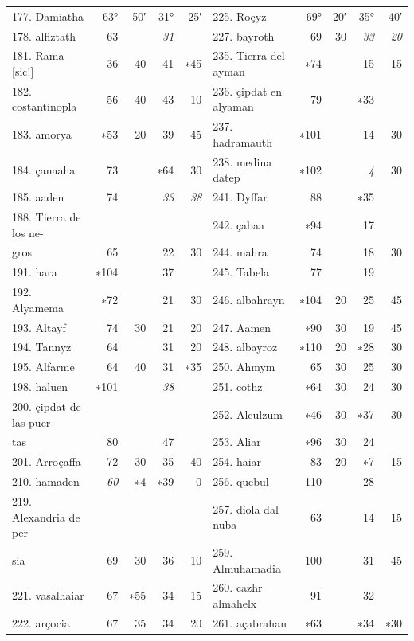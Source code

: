 \documentclass[11pt]{article}
\newcommand{\Pg}[1]{\marginpar{\footnotesize\color{gray}#1}}
\begin{document}
\Pg{II 217}\begin{center}\small\begin{tabular}{lrrrrlrrrr}
177. Damiatha & 63° & 50′ & 31° & 25′ & 225. Roçyz & 69° & 20′ & 35° & 40′ \\
178. alfiztath & 63 &  & \emph{31} &  & 227. bayroth & 69 & 30 & \emph{33} & \emph{20} \\
181. Rama [sic!] & 36 & 40 & 41 & ∗45 & 235. Tierra del ayman & ∗74 &  & 15 & 15 \\
182. costantinopla & 56 & 40 & 43 & 10 & 236. çipdat en alyaman & 79 &  & ∗33 &  \\
183. amorya & ∗53 & 20 & 39 & 45 & 237. hadramauth & ∗101 &  & 14 & 30 \\
184. çanaaha & 73 &  & ∗64 & 30 & 238. medina datep & ∗102 &  & \emph{4} & 30 \\
185. aaden & 74 &  & \emph{33} & \emph{38} & 241. Dyffar & 88 &  & ∗35 &  \\
188. Tierra de los ne- &  &  &  &  & 242. çabaa & ∗94 &  & 17 &  \\
gros & 65 &  & 22 & 30 & 244. mahra & 74 &  & 18 & 30 \\
191. hara & ∗104 &  & 37 &  & 245. Tabela & 77 &  & 19 &  \\
192. Alyamema & ∗72 &  & 21 & 30 & 246. albahrayn & ∗104 & 20 & 25 & 45 \\
193. Altayf & 74 & 30 & 21 & 20 & 247. Aamen & ∗90 & 30 & 19 & 45 \\
194. Tannyz & 64 &  & 31 & 20 & 248. albayroz & ∗110 & 20 & ∗28 & 30 \\
195. Alfarme & 64 & 40 & 31 & ∗35 & 250. Ahmym & 65 & 30 & 25 & 30 \\
198. haluen & ∗101 &  & \emph{38} &  & 251. cothz & ∗64 & 30 & 24 & 30 \\
200. çipdat de las puer- &  &  &  &  & 252. Alculzum & ∗46 & 30 & ∗37 & 30 \\
tas & 80 &  & 47 &  & 253. Aliar & ∗96 & 30 & 24 &  \\
201. Arroçaffa & 72 & 30 & 35 & 40 & 254. haiar & 83 & 20 & ∗7 & 15 \\
210. hamaden & \emph{60} & ∗4 & ∗39 & 0 & 256. quebul & 110 &  & 28 &  \\
219. Alexandria de per- &  &  &  &  & 257. diola dal nuba & 63 &  & 14 & 15 \\
sia & 69 & 30 & 36 & 10 & 259. Almuhamadia & 100 &  & 31 & 45 \\
221. vasalhaiar & 67 & ∗55 & 34 & 15 & 260. cazhr almahelx & 91 &  & 32 &  \\
222. arçocia & 67 & 35 & 34 & 20 & 261. açabrahan & ∗63 &  & ∗34 & ∗30 \\
\end{tabular}\end{center}
\end{document}
